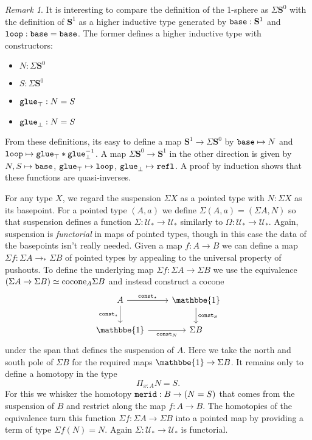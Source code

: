 \documentclass{amsart}
\theoremstyle{theorem}
\theoremstyle{definition}
\theoremstyle{remark}
\newtheorem*{rmk}{Remark}
\newcommand{\0}{\mathbbe{0}}
\newcommand{\1}{\mathbbe{1}}
\newcommand{\2}{\mathbbe{2}}
\newcommand{\3}{\mathbbe{3}}
\newcommand{\4}{\mathbbe{4}}
\newcommand{\term}[1]{{\textup{\texttt{#1}}}}
\newcommand{\type}[1]{{\textup{#1}}}
\newcommand{\refl}{\term{refl}}
\newcommand{\const}{\term{const}}
\newcommand{\glue}{\term{glue}}
\newcommand{\UU}{{\mathcal{U}}}
\newcommand{\Sone}{\mathbf{S}^1}
\newcommand{\Sn}[1]{\mathbf{S}^{#1}}
\newcommand{\base}{\term{base}}
\newcommand{\lloop}{\term{loop}}
\begin{document}
\begin{rmk} It is interesting to compare the definition of the 1-sphere as $\Sigma\Sn{0}$ with the definition of $\Sone$ as a higher inductive type generated by $\base : \Sone$ and $\lloop : \base = \base$. The former defines a higher inductive type with constructors:
\begin{itemize}
 \item $N : \Sigma\Sn{0}$
 \item $S : \Sigma\Sn{0}$
 \item $\glue_\top : N = S$
 \item $\glue_\bot : N = S$
 \end{itemize}
From these definitions, its easy to define a map $\Sone \to \Sigma\Sn{0}$ by $\base\mapsto N$ and $\lloop \mapsto \glue_\top \ast \glue_\bot^{-1}$. A map $\Sigma\Sn{0} \to \Sone$ in the other direction is given by $N, S \mapsto \base$, $\glue_\top \mapsto \lloop$, $\glue_\bot \mapsto \refl$. A proof by induction \cite[6.5.1]{book-hott} shows that these functions are quasi-inverses.
 \end{rmk}

For any type $X$, we regard the suspension $\Sigma X$ as a pointed type with $N : \Sigma X$ as its basepoint. For a pointed type $(A,a)$ we define $\Sigma (A,a) = (\Sigma A, N)$ so that suspension defines a function $\Sigma \colon \UU_* \to \UU_*$ similarly to $\Omega : \UU_* \to \UU_*$. Again, suspension is \emph{functorial} in maps of pointed types, though in this case the data of the basepoints isn't really needed. Given a map $f \colon A \to B$ we can define a map $\Sigma f : \Sigma A \to_* \Sigma B$ of pointed types by appealing to the universal property of pushouts. To define the underlying map $\Sigma f : \Sigma A \to \Sigma B$ we use the equivalence
$(\Sigma A \to \Sigma B) \simeq \type{cocone}_A \Sigma B$ and instead construct a cocone
\[
\begin{tikzcd} A \arrow[r, "\const_\star"] \arrow[d, "\const_\star"'] & \1 \arrow[d, "\const_S"] \\ \1 \arrow[r, "\const_N"'] & \Sigma B
\end{tikzcd}
\]
under the span that defines the suspension of $A$. Here we take the north and south pole of $\Sigma B$ for the required maps $\1 \to \Sigma B$. It remains only to define a homotopy in the type
\[ \Pi_{x:A} N = S.\] For this we whisker the homotopy $\term{merid} : B \to (N = S)$ that comes from the suspension of $B$ and restrict along the map $f \colon A \to B$. The homotopies of the equivalence turn this function $\Sigma f : \Sigma A \to \Sigma B$ into a pointed map by providing a term of type $\Sigma f(N) = N$. Again $\Sigma \colon \UU_* \to \UU_*$ is functorial.
\end{document}
